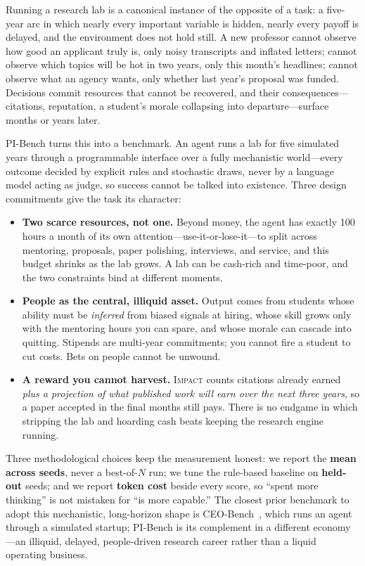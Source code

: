 \documentclass[11pt]{article}
\newcommand{\impact}{\textsc{Impact}}
\newcommand{\bench}{PI-Bench}
\begin{document}
Running a research lab is a canonical instance of the opposite of a task: a five-year arc in
which nearly every important variable is hidden, nearly every payoff is delayed, and the
environment does not hold still. A new professor cannot observe how good an applicant truly is,
only noisy transcripts and inflated letters; cannot observe which topics will be hot in two
years, only this month's headlines; cannot observe what an agency wants, only whether last
year's proposal was funded. Decisions commit resources that cannot be recovered, and their
consequences---citations, reputation, a student's morale collapsing into departure---surface
months or years later.

\bench{} turns this into a benchmark. An agent runs a lab for five simulated years through a
programmable interface over a fully mechanistic world---every outcome decided by explicit rules
and stochastic draws, never by a language model acting as judge, so success cannot be talked
into existence. Three design commitments give the task its character:
\begin{itemize}[leftmargin=1.4em,itemsep=2pt]
  \item \textbf{Two scarce resources, not one.} Beyond money, the agent has exactly 100 hours a
  month of its own attention---use-it-or-lose-it---to split across mentoring, proposals, paper
  polishing, interviews, and service, and this budget shrinks as the lab grows. A lab can be
  cash-rich and time-poor, and the two constraints bind at different moments.
  \item \textbf{People as the central, illiquid asset.} Output comes from students whose ability
  must be \emph{inferred} from biased signals at hiring, whose skill grows only with the
  mentoring hours you can spare, and whose morale can cascade into quitting. Stipends are
  multi-year commitments; you cannot fire a student to cut costs. Bets on people cannot be unwound.
  \item \textbf{A reward you cannot harvest.} \impact{} counts citations already earned
  \emph{plus a projection of what published work will earn over the next three years}, so a paper
  accepted in the final months still pays. There is no endgame in which stripping the lab and
  hoarding cash beats keeping the research engine running.
\end{itemize}
Three methodological choices keep the measurement honest: we report the \textbf{mean across
seeds}, never a best-of-$N$ run; we tune the rule-based baseline on \textbf{held-out} seeds; and
we report \textbf{token cost} beside every score, so ``spent more thinking'' is not mistaken for
``is more capable.'' The closest prior benchmark to adopt this mechanistic, long-horizon shape is
CEO-Bench~\citep{chen2026ceobench}, which runs an agent through a simulated startup; \bench{} is
its complement in a different economy---an illiquid, delayed, people-driven research career rather
than a liquid operating business.
\end{document}
